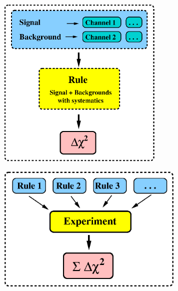 \begin{figure}[t]
\begin{center}
\includegraphics[width=8cm]{SignalBackground}
\end{center}
\end{figure}

\begin{figure}[t]
\begin{center}
\includegraphics[width=9cm]{Rules}
\end{center}
\end{figure}

